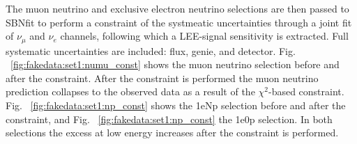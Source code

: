 The muon neutrino and exclusive electron neutrino selections are then passed to SBNfit to perform a constraint of the systmeatic uncertainties through a joint fit of $\nu_{\mu}$ and $\nu_e$ channels, following which a LEE-signal sensitivity is extracted.  Full systematic uncertainties are included: flux, genie, and detector.  %
Fig. ~\ref{fig:fakedata:set1:numu_const} shows the muon neutrino selection before and after the constraint. After the constraint is performed the muon neutrino prediction collapses to the observed data as a result of the $\chi^2$-based constraint.
Fig. ~\ref{fig:fakedata:set1:np_const} shows the 1eNp selection before and after the constraint, and Fig. ~\ref{fig:fakedata:set1:np_const} the 1e0p selection.  In both selections the excess at low energy increases after the constraint is performed.    
